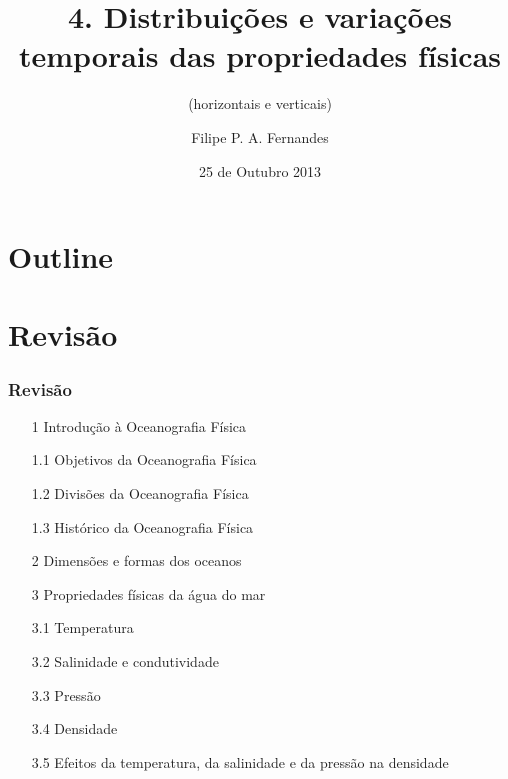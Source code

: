 \title[Aula 07]{4. Distribuições e variações temporais das propriedades físicas}
\subtitle{(horizontais e verticais)}
\author[Filipe Fernandes]{Filipe P. A. Fernandes}
\date[Outubro 2013]{25 de Outubro 2013}




\begin{frame}[plain]
  \titlepage
\end{frame}

\section*{Outline}
\begin{frame}
\tableofcontents
\end{frame}


\section{Revisão}
\begin{frame}
\frametitle{Revisão}
  \begin{itemize}[<+-| alert@+>]
    \item[1] Introdução à Oceanografia Física
    \item[1.1] Objetivos da Oceanografia Física
    \item[1.2] Divisões da Oceanografia Física
    \item[1.3] Histórico da Oceanografia Física
    \item[2] Dimensões e formas dos oceanos
    \item[3] Propriedades físicas da água do mar
    \item[3.1] Temperatura
    \item[3.2] Salinidade e condutividade
    \item[3.3] Pressão
    \item[3.4] Densidade
    \item[3.5] Efeitos da temperatura, da salinidade e da pressão na densidade
  \end{itemize}
\end{frame}


